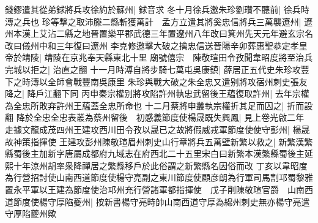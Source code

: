 錢鏐遣其從弟銶將兵攻徐約於蘇州|{
	銶音求}
冬十月徐兵邀朱珍劉瓚不聽前|{
	徐兵時漙之兵也}
珍等撃之取沛滕二縣斬獲萬計　孟方立遣其將奚忠信將兵三萬襲遼州|{
	遼州本漢上艾沾二縣之地晉置樂平郡武德三年置遼州八年改曰箕州先天元年避玄宗名改曰儀州中和三年復曰遼州}
李克修邀擊大破之擒忠信送晉陽辛卯葬惠聖恭定孝皇帝於靖陵|{
	靖陵在京兆奉天縣東北十里}
廟號僖宗　陳敬瑄田令孜聞韋昭度將至治兵完城以拒之|{
	治直之翻}
十一月時溥自將步騎七萬屯吳康鎮|{
	薛居正五代史朱珍攻豐下之時漙以全師會戰豐南吳康里}
朱珍與戰大破之朱全忠又遣别將攻宿州刺史張友降之|{
	降戶江翻下同}
丙申秦宗權别將攻陷許州執忠武留後王藴復取許州|{
	去年宗權為全忠所敗弃許州王藴蓋全忠所命也}
十二月蔡將申叢執宗權折其足而囚之|{
	折而設翻}
降於全忠全忠表叢為蔡州留後　初感義節度使楊晟既失興鳳|{
	見上卷光啟二年}
走據文龍成茂四州王建攻西川田令孜以晟已之故將假威戎軍節度使使守彭州|{
	楊晟故神策指揮使}
王建攻彭州陳敬瑄眉州刺史山行章將兵五萬壁新繁以救之|{
	新繁漢繁縣蜀後主加新字唐屬成都府九域志在府西北二十五里宋白曰新繁本漢繁縣蜀後主延熙十年涼州胡率衆降禪居之繁縣移戶於此俗謂之新繁縣名因俗而改}
丁亥以韋昭度為行營招討使山南西道節度使楊守亮副之東川節度使顧彦朗為行軍司馬割邛蜀黎雅置永平軍以王建為節度使治邛州充行營諸軍都指揮使　戊子削陳敬瑄官爵　山南西道節度使楊守厚陷夔州|{
	按新書楊守亮時帥山南西道守厚為綿州刺史無亦楊守亮遣守厚陷夔州歟}


